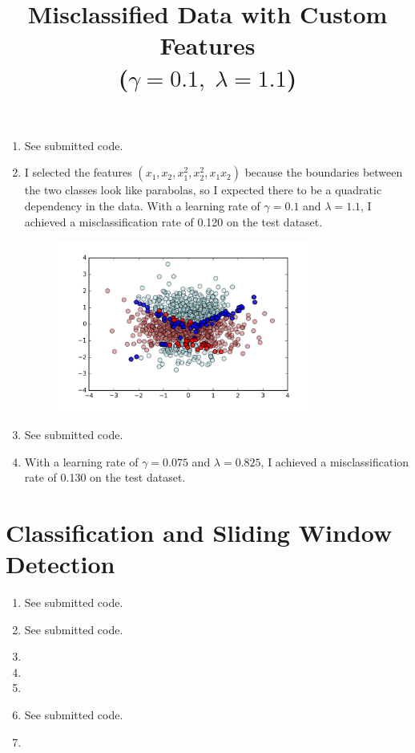 \documentclass[12pt]{article}
\begin{document}
\begin{enumerate}
\begin{figure}[H]
	\end{figure}
	\item See submitted code.
	\item I selected the features $(x_1, x_2, x_1^2, x_2^2, x_1x_2)$ because the boundaries between the two classes look like parabolas, so I expected there to be a quadratic dependency in the data. With a learning rate of $\gamma = 0.1$ and $\lambda = 1.1$, I achieved a misclassification rate of 0.120 on the test dataset.
	\begin{figure}[H]
		\centering
		\title{\bf Misclassified Data with Custom Features \\
			($\gamma = 0.1, \; \lambda = 1.1$)}
		\includegraphics[width=0.8\textwidth]{../Figures/hw2_3_vi.png}
	\end{figure}
	\item See submitted code.
	\item With a learning rate of $\gamma = 0.075$ and $\lambda = 0.825$, I achieved a misclassification rate of 0.130 on the test dataset.
\end{enumerate}

\section{Classification and Sliding Window Detection}
\begin{enumerate}
	\item See submitted code.
	\item See submitted code.
	\item 
	\item 
	\item 
	\item See submitted code.
	\item 
\end{enumerate}
\end{document}
